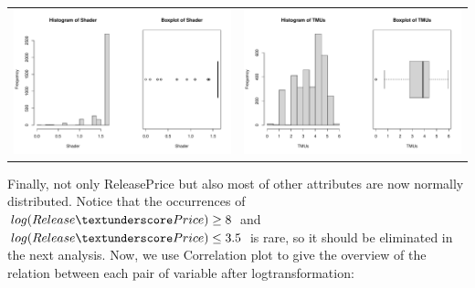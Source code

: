 \documentclass[a4paper]{article}
\let\le=\leq
\let\ge=\geq
\theoremstyle{definition}
\begin{document}
\begin{center}
\begin{adjustbox}{width=\textwidth}
    \begin{tabular}{cc}
        \includegraphics[keepaspectratio, width=1\textwidth, height=1\textheight]{Visualization/Rplot_19.pdf}
        &\includegraphics[keepaspectratio, width=1\textwidth, height=1\textheight]{Visualization/Rplot_20.pdf}\\
    \end{tabular}
\end{adjustbox}
\end{center}
Finally, not only Release\textunderscore Price but also most of other attributes are now normally distributed. Notice that the occurrences of $log(Release\textunderscore Price)\ge 8$ and $log(Release\textunderscore Price)\le 3.5$ is rare, so it should be eliminated in the next analysis. Now, we use Correlation plot to give the overview of the relation between each pair of variable after log\textunderscore transformation:\\
\end{document}
